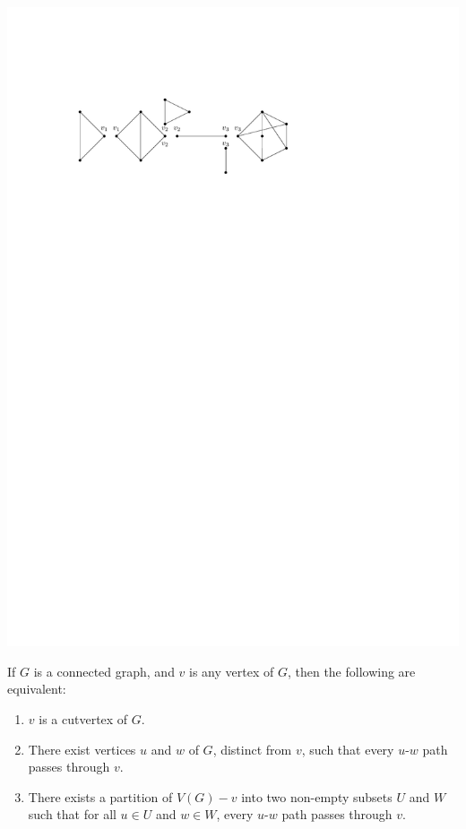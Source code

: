 \begin{Example}
\begin{center}
\includegraphics{Images/6BlockGraph2-Blocks.pdf}
\end{center}
\end{Example}

\begin{Theorem}\label{thm:CutverChar}
If $G$ is a connected graph, and $v$ is any vertex of $G$, then the following are equivalent:
\begin{enumerate}[label=(\roman*)]
\item\label{it:CutverChar1} $v$ is a cutvertex of $G$.
\item\label{it:CutverChar2} There exist vertices $u$ and $w$ of $G$, distinct from $v$, such that every $u$-$w$ path passes through $v$.
\item\label{it:CutverChar3} There exists a partition of $V(G) - v$ into two non-empty subsets $U$ and $W$ such that for all $u \in U$ and $w \in W$, every $u$-$w$ path passes through $v$.
\end{enumerate}
\end{Theorem}

